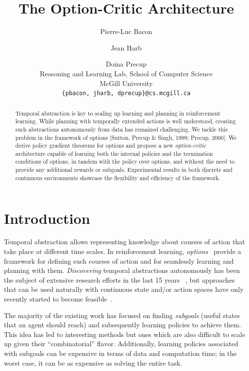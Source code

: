 \documentclass[letterpaper]{article}
\begin{document}
\title{The Option-Critic Architecture}
\author{Pierre-Luc Bacon \and Jean Harb \and Doina Precup \\
Reasoning and Learning Lab, School of Computer Science \\
McGill University\\
\texttt{\{pbacon, jharb, dprecup\}@cs.mcgill.ca}\\
}
\nocopyright
\maketitle
\begin{abstract}
Temporal abstraction is key to scaling up
learning and planning in reinforcement learning. While planning
with temporally extended actions  is well understood,
creating such abstractions autonomously from data has remained challenging. We tackle this problem
in the framework of options [Sutton, Precup \& Singh, 1999; Precup, 2000].
We derive policy gradient theorems for options and propose a new
{\em option-critic} architecture capable of learning both the
internal policies and the termination conditions of options, in tandem
with the policy over options, and without the need to provide any additional
rewards or subgoals. Experimental results
in both discrete and continuous environments showcase the flexibility and
efficiency of the framework.
 \end{abstract}

\section{Introduction}
Temporal abstraction allows representing
knowledge about courses of action that take place  at different time scales.
In reinforcement learning,
\textit{options}~\cite{Sutton1999opt,precup00} provide a framework for defining
such courses of action and for seamlessly learning and planning with them.
{\em Discovering} temporal abstractions autonomously
has been the subject of extensive research efforts in the last 15 years
~\cite{McGovern2001,Stolle2002,Menache2002,Simsek08,Silver2012},
but approaches that can be used naturally with continuous state and/or action spaces have only recently
started to become feasible~\cite{Konidaris2011,Niekum2013,Mann2015,Mankowitz2016,Kulkarni2016,Vezhnevets2016,Daniel2016}.

The majority of the existing work has focused on
finding {\em subgoals} (useful states that an agent should reach) and subsequently
learning policies to achieve them.
This idea has led to interesting methods but ones which are also difficult
to scale up given their  ``combinatorial'' flavor.
Additionally, learning policies associated with  subgoals can be expensive
in terms of data and computation time; in the worst case, it can be as expensive
as solving the entire task.
\end{document}
